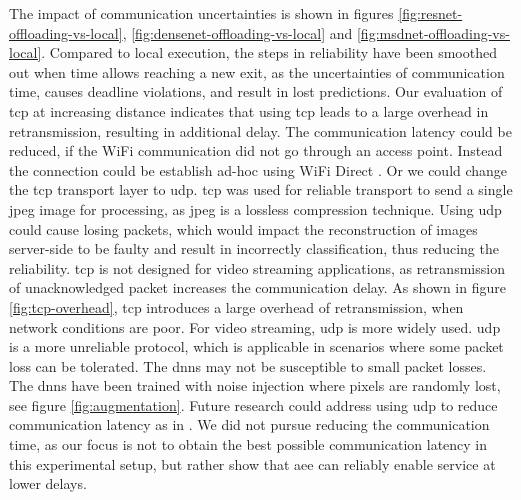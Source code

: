 The impact of communication uncertainties is shown in figures \ref{fig:resnet-offloading-vs-local}, \ref{fig:densenet-offloading-vs-local} and \ref{fig:msdnet-offloading-vs-local}. Compared to local execution, the steps in reliability have been smoothed out when time allows reaching a new exit, as the uncertainties of communication time, causes deadline violations, and result in lost predictions. Our evaluation of \gls{tcp} at increasing distance indicates that using \gls{tcp} leads to a large overhead in retransmission, resulting in additional delay. The communication latency could be reduced, if the WiFi communication did not go through an access point. Instead the connection could be establish ad-hoc using WiFi Direct \cite{noauthor_wi-fi_nodate}. Or we could change the \gls{tcp} transport layer to \gls{udp}. \gls{tcp} was used for reliable transport to send a single jpeg image for processing, as jpeg is a lossless compression technique. Using \gls{udp} could cause losing packets, which would impact the reconstruction of images server-side to be faulty and result in incorrectly classification, thus reducing the reliability. \gls{tcp} is not designed for video streaming applications, as retransmission of unacknowledged packet increases the communication delay. As shown in figure \ref{fig:tcp-overhead}, \gls{tcp} introduces a large overhead of retransmission, when network conditions are poor. For video streaming, \gls{udp} is more widely used. \gls{udp} is a more unreliable protocol, which is applicable in scenarios where some packet loss can be tolerated. The \gls{dnn}s may not be susceptible to small packet losses. The \gls{dnn}s have been trained with noise injection where pixels are randomly lost, see figure \ref{fig:augmentation}. Future research could address using \gls{udp} to reduce communication latency as in \cite{liu_maximizing_2019}. We did not pursue reducing the communication time, as our focus is not to obtain the best possible communication latency in this experimental setup, but rather show that \gls{aee} can reliably enable service at lower delays. 

